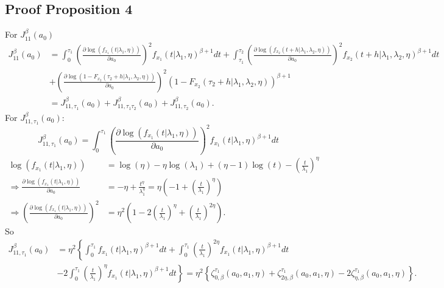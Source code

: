 \documentclass{article}
\begin{document}
\subsection{Proof Proposition 4}

For  $J_{11}^{\beta}(a_0)$
\begin{align*}
J_{11}^{\beta}(a_0)&=\int_{0}^{\tau_1}\left(\frac{\partial \log\left(f_{x_1}(t|\lambda_1,\eta)\right)}{\partial a_0}\right)^2 f_{x_1}(t|\lambda_1,\eta)^{\beta+1}dt+\int_{\tau_1}^{\tau_2}\left(\frac{\partial \log\left(f_{x_2}(t+h|\lambda_1,\lambda_2,\eta)\right)}{\partial a_0}\right)^2 f_{x_2}(t+h|\lambda_1,\lambda_2,\eta)^{\beta+1}dt
\\
&+\left(\frac{\partial \log\left(1-F_{x_2}(\tau_2+h|\lambda_1,\lambda_2,\eta)\right)}{\partial a_0}\right)^2 \left(1-F_{x_2}(\tau_2+h|\lambda_1,\lambda_2,\eta)\right)^{\beta+1}
\\
&=J_{11,\tau_1}^{\beta}(a_0)+J_{11,\tau_1 \tau_2}^{\beta} (a_0)+ J_{11,\tau_2}^{\beta}(a_0).
\end{align*}
For $J_{11,\tau_1}^{\beta}(a_0)$:
\begin{equation*}
J_{11,\tau_1}^{\beta}(a_0)=\int_{0}^{\tau_1}\left(\frac{\partial \log\left(f_{x_1}(t|\lambda_1,\eta)\right)}{\partial a_0}\right)^2 f_{x_1}(t|\lambda_1,\eta)^{\beta+1}dt
\end{equation*}
\begin{align}
\log \left(f_{x_1}(t|\lambda_1,\eta)\right)&=\log(\eta)-\eta\log(\lambda_1)+(\eta-1)\log(t)-\left(\frac{t}{\lambda_1}\right)^{\eta} \nonumber
\\
\Rightarrow \frac{\partial  \log \left(f_{x_1}(t|\lambda_1,\eta)\right)}{\partial a_0}&=-\eta +\frac{t^{\eta}}{\lambda_1^{\eta}}=\eta\left(-1+\left(\frac{t}{\lambda_1}\right)^{\eta}\right) \nonumber
\\
\Rightarrow \left( \frac{\partial  \log \left(f_{x_1}(t|\lambda_1,\eta)\right)}{\partial a_0}\right)^2&=\eta^2\left(1-2\left(\frac{t}{\lambda_1}\right)^\eta+\left(\frac{t}{\lambda_1}\right)^{2\eta}\right).
\label{eq:dev_f1_a0}
\end{align}
So
\begin{align*}
J_{11,\tau_1}^{\beta}(a_0)&=\eta^2\left\{ \int_{0}^{\tau_1} f_{x_1}(t|\lambda_1,\eta)^{\beta+1}dt+ \int_{0}^{\tau_1} \left(\frac{t}{\lambda_1}\right)^{2\eta} f_{x_1}(t|\lambda_1,\eta)^{\beta+1}dt\right.
\\
&\left.-2\int_{0}^{\tau_1} \left(\frac{t}{\lambda_1}\right)^{\eta} f_{x_1}(t|\lambda_1,\eta)^{\beta+1}dt\right\}=\eta^2\left\{ \zeta_{0,\beta}^{\tau_1}(a_0,a_1,\eta)+\zeta_{2\eta,\beta}^{\tau_1}(a_0,a_1,\eta)-2\zeta_{\eta,\beta}^{\tau_1}(a_0,a_1,\eta)\right\}.
\end{align*}
\end{document}
